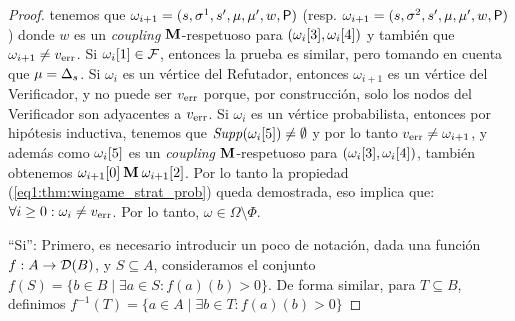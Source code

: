 \begin{proof}
tenemos que $\omega_{i+1} =  (s, \sigma^1, s', \mu, \mu', w,  \Probabilistic)$
(resp. $\omega_{i+1} =  (s, \sigma^2, s', \mu, \mu', w, \Probabilistic)$) donde $w$ es un \textit{coupling}
$\M$-respetuoso para $(\pr{3}{\omega_i},  \pr{4}{\omega_i})$ y también que  
$\omega_{i+1} \neq \ErrorSt$. Si $\pr{1}{\omega_i} \in \faults$,
entonces la prueba es similar, pero tomando en cuenta que $\mu = \Dirac_s$.
Si $\omega_i$ es un vértice del Refutador, entonces $\omega_{i+1}$ es un vértice del Verificador, y no puede ser $\ErrorSt$ porque, por construcción, solo los nodos del Verificador son adyacentes a $\ErrorSt$.
Si $\omega_i$ es un vértice probabilista, entonces por hipótesis inductiva, tenemos que $\support{\pr{5}{\omega_i}} \neq \emptyset$ y por lo tanto $\ErrorSt \neq \omega_{i+1}$,
y además como $\pr{5}{\omega_i}$ es un \textit{coupling} $\M$-respetuoso para $(\pr{3}{\omega_i},  \pr{4}{\omega_i})$, también obtenemos  
$ \pr{0}{\omega_{i+1}}  \M \pr{2}{\omega_{i+1}}$. Por lo tanto la propiedad (\ref{eq1:thm:wingame_strat_prob}) queda demostrada,  eso implica que:
$\forall i \geq 0 : \omega_i \neq \ErrorSt$. Por lo tanto, $\omega \in \Omega \setminus \Phi$.

``Si'': Primero, es necesario introducir un poco de notación, dada una función $f: A \rightarrow \Dist(B)$,  y $S \subseteq A$, 
consideramos el conjunto $f(S)= \{ b \in B \mid \exists a \in S: f(a)(b) > 0 \}$.
De forma similar, para $T \subseteq B$, definimos $f^{-1}(T) = \{ a \in A \mid \exists b \in T : f(a)(b) > 0\}$


\end{proof}
